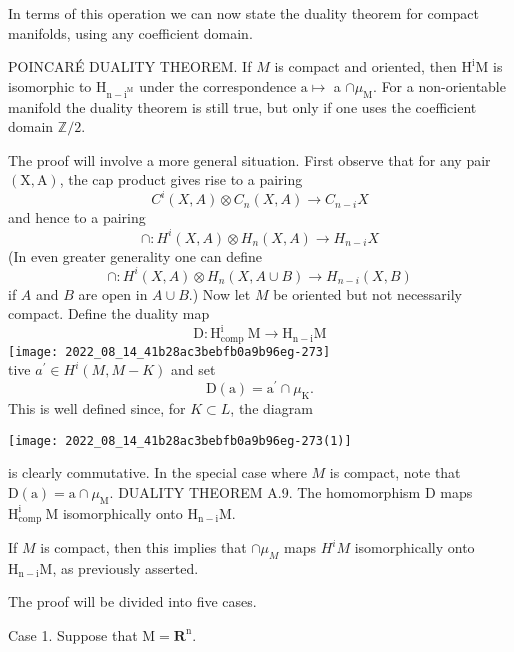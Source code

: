 \documentclass[10pt]{article}
\begin{document}
In terms of this operation we can now state the duality theorem for compact manifolds, using any coefficient domain.

POINCARÉ DUALITY THEOREM. If $M$ is compact and oriented, then $\mathrm{H}^{\mathrm{i}} \mathrm{M}$ is isomorphic to $\mathrm{H}_{\mathrm{n}-\mathrm{i}^{\mathrm{M}}}$ under the correspondence $\mathrm{a} \mapsto$ a $\cap \mu_{\mathrm{M}}$. For a non-orientable manifold the duality theorem is still true, but only if one uses the coefficient domain $\mathbb{Z} / 2$.

The proof will involve a more general situation. First observe that for any pair $(\mathrm{X}, \mathrm{A})$, the cap product gives rise to a pairing
$$
C^{i}(X, A) \otimes C_{n}(X, A) \rightarrow C_{n-i} X
$$
and hence to a pairing
$$
\cap: H^{i}(X, A) \otimes H_{n}(X, A) \rightarrow H_{n-i} X
$$
(In even greater generality one can define
$$
\cap: H^{i}(X, A) \otimes H_{n}(X, A \cup B) \rightarrow H_{n-i}(X, B)
$$
if $A$ and $B$ are open in $A \cup B$.) Now let $M$ be oriented but not necessarily compact. Define the duality map
$$
\mathrm{D}: \mathrm{H}_{\text {comp }}^{\mathrm{i}} \mathrm{M} \rightarrow \mathrm{H}_{\mathrm{n}-\mathrm{i}} \mathrm{M}
$$
\texttt{[image: 2022\_08\_14\_41b28ac3bebfb0a9b96eg-273]}\\
tive $a^{\prime} \in H^{i}(M, M-K)$ and set
$$
\mathrm{D}(\mathrm{a})=\mathrm{a}^{\prime} \cap \mu_{\mathrm{K}} .
$$
This is well defined since, for $K \subset L$, the diagram

\texttt{[image: 2022\_08\_14\_41b28ac3bebfb0a9b96eg-273(1)]}

is clearly commutative. In the special case where $M$ is compact, note that $\mathrm{D}(\mathrm{a})=\mathrm{a} \cap \mu_{\mathrm{M}}$. DUALITY THEOREM A.9. The homomorphism D maps $\mathrm{H}_{\text {comp }}^{\mathrm{i}} \mathrm{M}$ isomorphically onto $\mathrm{H}_{\mathrm{n}-\mathrm{i}} \mathrm{M}$.

If $M$ is compact, then this implies that $\cap \mu_{M}$ maps $H^{i} M$ isomorphically onto $\mathrm{H}_{\mathrm{n}-\mathrm{i}} \mathrm{M}$, as previously asserted.

The proof will be divided into five cases.

Case 1. Suppose that $\mathrm{M}=\mathbf{R}^{\mathrm{n}}$.
\end{document}
